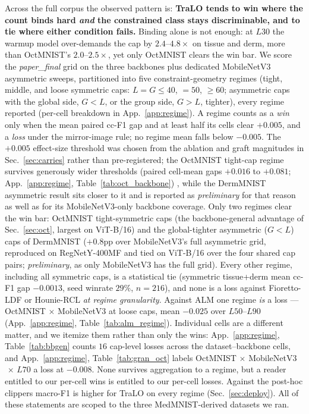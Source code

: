 \documentclass[10pt]{article}
\begin{document}
Across the full corpus the observed pattern is: \textbf{TraLO tends to win
where the count binds hard \emph{and} the constrained class stays
discriminable, and to tie where either condition fails.} Binding alone is not enough: at
$L30$ the warmup model over-demands the cap by $2.4$--$4.8\times$ on tissue
and derm, more than OctMNIST's $2.0$--$2.5\times$, yet only OctMNIST clears
the win bar. We score the \emph{paper\_final} grid on the three backbones
plus dedicated MobileNetV3 asymmetric sweeps, partitioned into five
constraint-geometry regimes (tight, middle, and loose symmetric caps:
$L{=}G{\le}40$, ${=}50$, ${\ge}60$; asymmetric caps with the global side,
$G{<}L$, or the group side, $G{>}L$, tighter), every regime reported
(per-cell breakdown in App.~\ref{app:regime}). A regime counts as a
\emph{win} only when the mean paired cc-F1 gap and at least half its
cells clear $+0.005$, and a \emph{loss} under the mirror-image rule; no
regime mean falls below $-0.005$. The $+0.005$ effect-size threshold
was chosen from the ablation and graft magnitudes in
Sec.~\ref{sec:carries} rather than pre-registered; the OctMNIST
tight-cap regime survives generously wider thresholds (paired cell-mean
gaps $+0.016$ to $+0.081$; {App.~\ref{app:regime}, }Table~\ref{tab:oct_backbone})%
{, while the DermMNIST asymmetric result sits closer to it and is}
reported as \emph{preliminary} for that reason as well as for its
MobileNetV3-only backbone coverage. Only two regimes clear the win bar:
OctMNIST tight-symmetric caps (the backbone-general advantage of
Sec.~\ref{sec:oct}, largest on ViT-B/16) and the global-tighter
asymmetric ($G{<}L$) caps of DermMNIST ($+0.8$pp over MobileNetV3's full
asymmetric grid, reproduced on RegNet{Y-400MF} and tied on ViT{-B/16} over the four shared
cap pairs; \emph{preliminary}, as only MobileNetV3 has the full grid).
Every other regime, including all symmetric caps, is a statistical tie
(symmetric tissue+derm mean cc-F1 gap $-0.0013$, seed winrate $29\%$,
$n{=}216$), and none is a loss{ against Fioretto-LDF or Hounie-RCL
\emph{at regime granularity}. Against ALM one regime \emph{is} a loss --- OctMNIST
$\times$ MobileNetV3 at loose caps, mean $-0.025$ over $L50$--$L90$
({App.~\ref{app:regime}, }Table~\ref{tab:alm_regime}).
Individual cells are a different matter, and we itemize them rather than only
the wins: {App.~\ref{app:regime}, }Table~\ref{tab:bbgen} counts $16$ cap-level losses across the
dataset--backbone cells, and {App.~\ref{app:regime}, }Table~\ref{tab:gran_oct} labels
OctMNIST$\,\times\,$MobileNetV3$\,\times\,L70$ a loss at $-0.008$. None survives
aggregation to a regime, but a reader entitled to our per-cell wins is entitled
to our per-cell losses}. Against the post-hoc clippers macro-F1 is
higher for TraLO on every regime (Sec.~\ref{sec:deploy}). All of these
statements are scoped to the three MedMNIST-derived datasets we ran.
\end{document}

